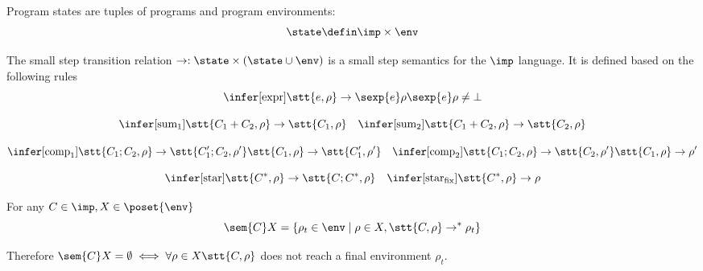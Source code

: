 \begin{definition}
  Program states are tuples of programs and program
  environments: \[\state \defin \imp \times \env\]
\end{definition}

\begin{definition}\label{def:sosem}
  The small step transition relation \(\to : \state \times (\state
  \cup \env)\) is a small step semantics for the
  \(\imp\) language. It is defined based on the following rules
  \[\infer[\text{expr}]
          {\stt{e, \rho} \to \sexp{e}\rho}
          {\sexp{e}\rho \neq \bot}\]
          
          \[\infer[\text{sum}_1]
                  {\stt{C_1 + C_2, \rho} \to \stt{C_1, \rho}}
                  {} \quad
                  \infer[\text{sum}_2]
                        {\stt{C_1 + C_2, \rho} \to \stt{C_2, \rho}}
                        {}\]
                        
                        \[\infer[\text{comp}_1]
                                {\stt{C_1; C_2, \rho} \to \stt{C_1'; C_2, \rho'}}
                                {\stt{C_1, \rho} \to \stt{C_1', \rho'}} \quad
                                \infer[\text{comp}_2]
                                      {\stt{C_1; C_2, \rho} \to \stt{C_2, \rho'}}
                                      {\stt{C_1, \rho} \to \rho'}\]

                                      \[\infer[\text{star}]
                                              {\stt{C^*, \rho} \to \stt{C;C^*, \rho}}
                                              {} \quad
                                              \infer[\text{star}_{\text{fix}}]
                                                    {\stt{C^*, \rho} \to \rho}
                                                    {}\]
\end{definition}

\begin{lemma}\label{le:link}
  For any \(C\in\imp, X \in \poset{\env}\) \[\sem{C}X = \{\rho_t \in
  \env \mid \rho \in X, \stt{C, \rho} \to^* \rho_t\}\]
\end{lemma}

Therefore \(\sem{C}X = \emptyset \iff \forall \rho \in X
\stt{C,\rho}\) does not reach a final environment \(\rho_t\).

